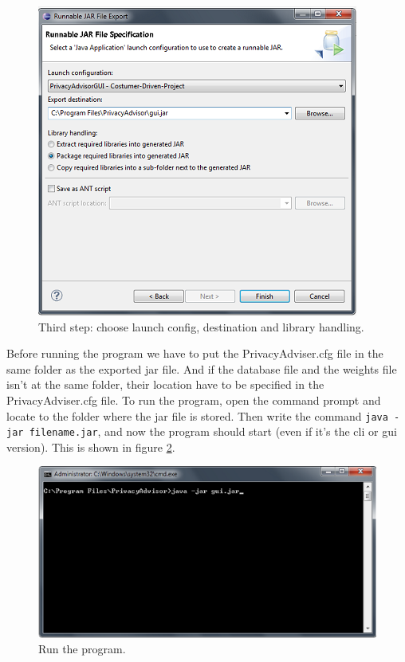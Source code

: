   \begin{figure}
\begin{centering}
    \includegraphics{Documentation/export_last.png}
    \caption{Third step: choose launch config, destination and library handling.}
    \label{exportLastStep}
\end{centering}
  \end{figure}


Before running the program we have to put the PrivacyAdviser.cfg file in the same folder as the exported jar file. And if the database file and the weights file isn't at the same folder, their location have to be specified in the PrivacyAdviser.cfg file. To run the program, open the command prompt and locate to the folder where the jar file is stored. Then write the command \texttt{java -jar filename.jar}, and now the program should start (even if it's the cli or gui version). This is shown in figure \ref{runProgram}.



  \begin{figure}
  \begin{centering}
    \includegraphics{Documentation/run.png}
    \caption{Run the program.}
    \label{runProgram}
    \end{centering}
  \end{figure}


